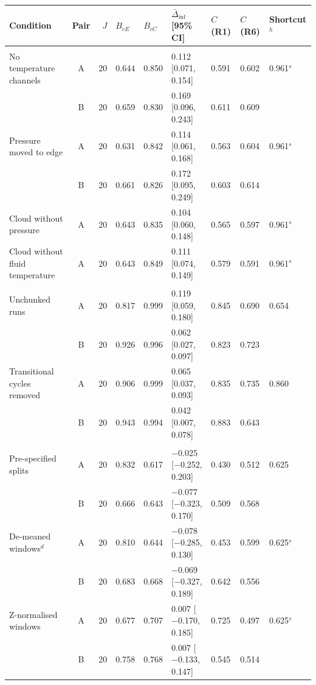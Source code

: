 \begin{tabular}{@{}>{\raggedright\arraybackslash}p{2.9cm} c r lll ll l@{}}
\toprule
Condition & Pair & $J$ & $B_{eE}$ & $B_{cC}$ & $\bar\Delta_{\mathrm{inf}}$ [95\% CI] & $C$(R1) & $C$(R6) & Shortcut$^{h}$ \\
\midrule
\multicolumn{9}{@{}l}{\textit{SKAB, channel controls}} \\
No temperature channels & A & 20 & 0.644 & 0.850 & 0.112 [0.071, 0.154] & 0.591 & 0.602 & 0.961$^{s}$ \\
 & B & 20 & 0.659 & 0.830 & 0.169 [0.096, 0.243] & 0.611 & 0.609 &  \\
Pressure moved to edge & A & 20 & 0.631 & 0.842 & 0.114 [0.061, 0.168] & 0.563 & 0.604 & 0.961$^{s}$ \\
 & B & 20 & 0.661 & 0.826 & 0.172 [0.095, 0.249] & 0.603 & 0.614 &  \\
Cloud without pressure & A & 20 & 0.643 & 0.835 & 0.104 [0.060, 0.148] & 0.565 & 0.597 & 0.961$^{s}$ \\
Cloud without fluid temperature & A & 20 & 0.643 & 0.849 & 0.111 [0.074, 0.149] & 0.579 & 0.591 & 0.961$^{s}$ \\
\multicolumn{9}{@{}l}{\textit{Hydraulic, further controls}} \\
Unchunked runs & A & 20 & 0.817 & 0.999 & 0.119 [0.059, 0.180] & 0.845 & 0.690 & 0.654 \\
 & B & 20 & 0.926 & 0.996 & 0.062 [0.027, 0.097] & 0.823 & 0.723 &  \\
Transitional cycles removed & A & 20 & 0.906 & 0.999 & 0.065 [0.037, 0.093] & 0.835 & 0.735 & 0.860 \\
 & B & 20 & 0.943 & 0.994 & 0.042 [0.007, 0.078] & 0.883 & 0.643 &  \\
\multicolumn{9}{@{}l}{\textit{SEU}} \\
Pre-specified splits & A & 20 & 0.832 & 0.617 & $-$0.025 [$-$0.252, 0.203] & 0.430 & 0.512 & 0.625 \\
 & B & 20 & 0.666 & 0.643 & $-$0.077 [$-$0.323, 0.170] & 0.509 & 0.568 &  \\
De-meaned windows$^{d}$ & A & 20 & 0.810 & 0.644 & $-$0.078 [$-$0.285, 0.130] & 0.453 & 0.599 & 0.625$^{s}$ \\
 & B & 20 & 0.683 & 0.668 & $-$0.069 [$-$0.327, 0.189] & 0.642 & 0.556 &  \\
Z-normalised windows & A & 20 & 0.677 & 0.707 & 0.007 [$-$0.170, 0.185] & 0.725 & 0.497 & 0.625$^{s}$ \\
 & B & 20 & 0.758 & 0.768 & 0.007 [$-$0.133, 0.147] & 0.545 & 0.514 &  \\

\end{tabular}

